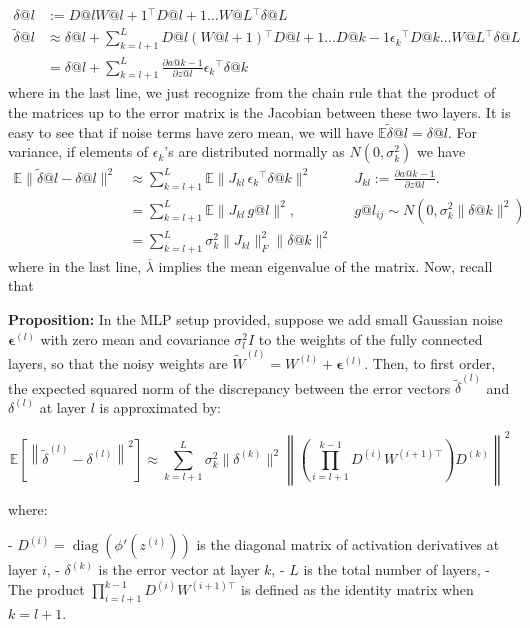 \documentclass{article}
\newcommand{\1}{\mathbf{1}}
\newcommand{\E}{\mathbb{E}}
\newcommand{\T}{\ensuremath{{}^{\top}}}
\begin{document}
\begin{align*}
    \delta@l&:=D@l W@{l+1}\T D@{l+1} \dots W@L\T \delta@L\\
    \tilde \delta@l&\approx \delta@l +  \sum_{k=l+1}^{L} D@l (W@{l+1})\T D@{l+1} \dots D@{k-1} \epsilon_k\T D@k \dots W@L\T \delta@L \\
    &= \delta@l + \sum_{k=l+1}^L \frac{\partial a@{k-1}}{\partial z@l} \epsilon_k\T \delta@k 
\end{align*}
where in the last line, we just recognize from the chain rule that the product of the matrices up to the error matrix is the Jacobian between these two layers.  
It is easy to see that if noise terms have zero mean, we will have $\E \tilde\delta@l = \delta @l.$ For variance, if elements of $\epsilon_k$'s are distributed normally as $N(0,\sigma_k^2)$ we have 
\begin{align*}
\E \|\tilde\delta@l-\delta@l\|^2 &\approx  \sum_{k=l+1}^L \E \|J_{kl}\, \epsilon_k\T \delta@k \|^2 && J_{kl}:=\frac{\partial a@{k-1}}{\partial z@l}. \\
&= \sum_{k=l+1}^L \E \|J_{kl}\, g@l \|^2, && g@l_{ij}\sim N(0,\sigma_k^2 \|\delta@k\|^2 )\\
&=  \sum_{k=l+1}^L \sigma^2_k \|J_{kl}\|_F^2 \|\delta@k\|^2
\end{align*}
where in the last line, $\overline{\lambda}$ implies the mean eigenvalue of the matrix. Now, recall that 

\textbf{Proposition:}
In the MLP setup provided, suppose we add small Gaussian noise \(\boldsymbol{\epsilon}^{(l)}\) with zero mean and covariance \(\sigma_l^2 I\) to the weights of the fully connected layers, so that the noisy weights are \(\tilde{W}^{(l)} = W^{(l)} + \boldsymbol{\epsilon}^{(l)}\). Then, to first order, the expected squared norm of the discrepancy between the error vectors \(\tilde{\delta}^{(l)}\) and \(\delta^{(l)}\) at layer \(l\) is approximated by:

\[
\mathbb{E}\left[ \left\| \tilde{\delta}^{(l)} - \delta^{(l)} \right\|^2 \right] \approx \sum_{k = l+1}^{L} \sigma_k^2 \|\delta^{(k)} \|^2 \left\| \left( \prod_{i = l+1}^{k-1} D^{(i)} W^{(i+1)\top} \right) D^{(k)}\right\|^2 
\]

where:

- \(D^{(i)} = \operatorname{diag}\left( \phi'\left( z^{(i)} \right) \right)\) is the diagonal matrix of activation derivatives at layer \(i\),
- \(\delta^{(k)}\) is the error vector at layer \(k\),
- \(L\) is the total number of layers,
- The product \(\prod_{i = l+1}^{k-1} D^{(i)} W^{(i+1)\top}\) is defined as the identity matrix when \(k = l+1\).
\end{document}
